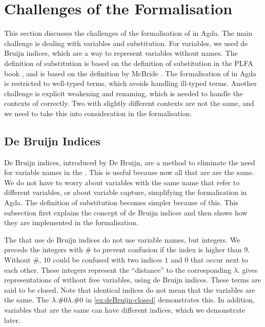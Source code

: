 \section{Challenges of the Formalisation}
This section discusses the challenges of the formalisation of \lab in Agda.
The main challenge is dealing with variables and substitution.
For variables, we used de Bruijn indices, which are a way to represent variables without names.
The definition of substitution is based on the definition of substitution in the PLFA book \cite{plfa22.08},
and is based on the definition by McBride \cite{BENTON2012}.
The formalisation of \lab in Agda is restricted to well-typed terms, which avoids handling ill-typed terms.
Another challenge is explicit weakening and renaming, which is needed to handle the contexts of \lterms correctly.
Two \lterms with slightly different contexts are not the same, and we need to take this into consideration in the formalisation.

\subsection{De Bruijn Indices}
De Bruijn indices, introduced by De Bruijn, are a method to eliminate the need for variable names in the \lc \cite{DEBRUIJN1972381}.
This is useful because now all \lterms that are \aeqt are the same. 
We do not have to worry about variables with the same name that refer to different variables, or about variable capture, simplifying the formalisation in Agda.
The definition of substitution becomes simpler because of this.
This subsection first explains the concept of de Bruijn indices and then shows how they are implemented in the formalisation.

The \lterms that use de Bruijn indices do not use variable names, but integers. We precede the integers with \# to prevent confusion if the index is higher than 9.
Without \#, $10$ could be confused with two indices $1$ and $0$ that occur next to each other. 
These integers represent the ``distance'' to the corresponding $\lambda$. 
 gives representations of \lterms without free variables, using de Bruijn indices.
These terms are said to be closed.
Note that identical indices do not mean that the variables are the same. The \lterm $\lambda {}.{\#0}\lambda {}.{\#0}$ in \cref{ex:deBruijn-closed} demonstrates this.
In addition, variables that are the same can have different indices, which we demonstrate later.

